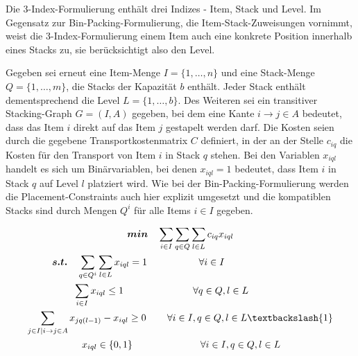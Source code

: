 Die 3-Index-Formulierung enthält drei Indizes - Item, Stack und Level.
Im Gegensatz zur Bin-Packing-Formulierung, die Item-Stack-Zuweisungen vornimmt, weist die 3-Index-Formulierung einem
Item auch eine konkrete Position innerhalb eines Stacks zu, sie berücksichtigt also den Level.

Gegeben sei erneut eine Item-Menge $I = \{1, \dotsc, n\}$ und eine Stack-Menge $Q = \{1, \dotsc, m\}$, die Stacks der Kapazität $b$ enthält.
Jeder Stack enthält dementsprechend die Level $L = \{1, \dotsc, b\}$. Des Weiteren sei ein transitiver Stacking-Graph
$G = (I, A)$ gegeben, bei dem eine Kante $i \rightarrow j \in A$ bedeutet, dass das Item $i$ direkt auf das Item $j$ gestapelt werden darf.
Die Kosten seien durch die gegebene Transportkostenmatrix $C$ definiert, in der an der Stelle $c_{iq}$ die Kosten für den
Transport von Item $i$ in Stack $q$ stehen. Bei den Variablen $x_{iql}$ handelt es sich um Binärvariablen,
bei denen $x_{iql} = 1$ bedeutet, dass Item $i$ in Stack $q$ auf Level $l$ platziert wird. Wie bei der Bin-Packing-Formulierung
werden die Placement-Constraints auch hier explizit umgesetzt und die kompatiblen Stacks sind durch Mengen $Q^i$ für
alle Items $i \in I$ gegeben.

\begin{gather}
\boldsymbol{min} \quad \sum_{i \in I} \sum_{q \in Q} \sum_{l \in L} c_{iq} x_{iql} \label{three_idx_line_one} \\
\boldsymbol{s.t.} \quad \sum_{q \in Q^i} \sum_{l \in L} x_{iql} = 1 \quad\thinspace\thinspace\quad\quad\quad\quad \forall i \in I \thinspace\thinspace\quad\quad\quad\quad\quad\quad\quad\quad\thinspace\thinspace \label{three_idx_line_two} \\
\sum_{i \in I} x_{iql} \leq 1 \thinspace\quad\quad\quad\quad\quad\quad\quad \forall q \in Q, l \in L \thinspace\thinspace\thinspace\thinspace\quad\quad\quad\thinspace \label{three_idx_line_three} \\
\sum_{j \in I | i \rightarrow j \in A} x_{jq(l-1)} - x_{iql} \geq 0 \thinspace\quad\quad \forall i \in I, q \in Q, l \in L \textbackslash \{1\}
\label{three_idx_line_four} \\
\quad\quad x_{iql} \in \{0, 1\} \quad\quad\quad\quad\quad\quad\quad \forall i \in I, q \in Q, l \in L \quad\thinspace\thinspace\thinspace\thinspace\thinspace \label{three_idx_line_five}
\end{gather}

